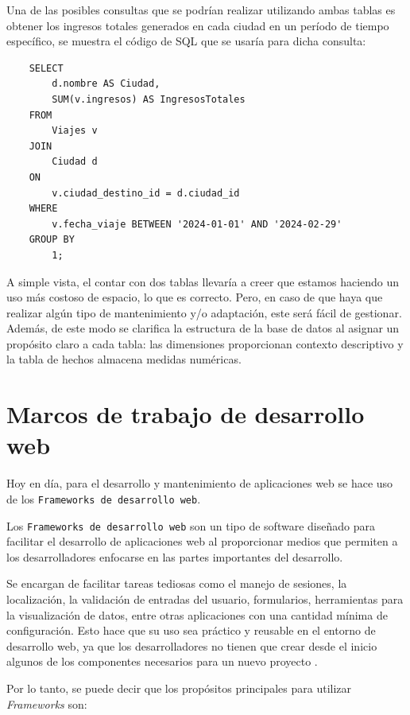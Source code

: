 Una de las posibles consultas que se podrían realizar utilizando ambas tablas es obtener los ingresos totales generados en cada ciudad en un período de tiempo específico, se muestra el código de SQL que se usaría para dicha consulta:

\begin{verbatim}
    SELECT
        d.nombre AS Ciudad,
        SUM(v.ingresos) AS IngresosTotales
    FROM
        Viajes v
    JOIN
        Ciudad d 
    ON 
        v.ciudad_destino_id = d.ciudad_id
    WHERE
        v.fecha_viaje BETWEEN '2024-01-01' AND '2024-02-29'
    GROUP BY
        1;
\end{verbatim}


A simple vista, el contar con dos tablas llevaría a creer que estamos haciendo un uso más costoso de espacio, lo que es correcto. Pero, en caso de que haya que realizar algún tipo de mantenimiento y/o adaptación, este será fácil de gestionar.
Además, de este modo se clarifica la estructura de la base de datos al asignar un propósito claro a cada tabla: las dimensiones proporcionan contexto descriptivo y la tabla de hechos almacena medidas numéricas.

\section{Marcos de trabajo de desarrollo web}\label{sec:framework}

Hoy en día, para el desarrollo y mantenimiento de aplicaciones web se hace uso de los \texttt{Frameworks de desarrollo web}.

Los \texttt{Frameworks de desarrollo web} son un tipo de software diseñado para facilitar el desarrollo de aplicaciones web al proporcionar medios que permiten a los desarrolladores enfocarse en las partes importantes del desarrollo. 

Se encargan de facilitar tareas tediosas como el manejo de sesiones, la localización, la validación de entradas del usuario, formularios, herramientas para la visualización de datos, entre otras aplicaciones con una cantidad mínima de configuración. Esto hace que su uso sea práctico y reusable en el entorno de desarrollo web, ya que los desarrolladores no tienen que crear desde el inicio algunos de los componentes necesarios para un nuevo proyecto \cite{garcia2018analisis}.

Por lo tanto, se puede decir que los propósitos principales para utilizar \textit{Frameworks} son:

